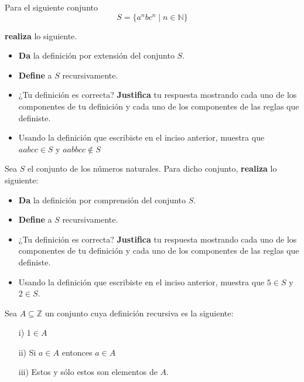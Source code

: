 \documentclass[oneside]{style}
\begin{document}
\begin{questions}[label=\protect\circled{\bfseries\arabic*}]
    \question
    {
        Para el siguiente conjunto 
        \begin{equation*}
            S = \{a^n b c^n \; | \; n \in \mathbb{N}\}
        \end{equation*}

        \textbf{realiza} lo siguiente.
        \begin{itemize}
            \item \textbf{Da} la definición por extensión del conjunto $S$.
            \item \textbf{Define} a $S$ recursivamente.
            \item ¿Tu definición es correcta? \textbf{Justifica} tu respuesta 
            mostrando cada uno de los componentes de tu definición y cada uno 
            de los componentes de las reglas que definiste. 
            \item Usando la definición que escribiste en el inciso anterior, 
            muestra que $aabcc \in S$ y $aabbcc \not \in S$
        \end{itemize}
    }

    \question
    {
        Sea $S$ el conjunto de los números naturales. Para dicho conjunto, 
        \textbf{realiza} lo siguiente:
        \begin{itemize}
            \item \textbf{Da} la definición por comprensión del conjunto $S$.
            \item \textbf{Define} a $S$ recursivamente.
            \item ¿Tu definición es correcta? \textbf{Justifica} tu respuesta 
            mostrando cada uno de los componentes de tu definición y cada uno 
            de los componentes de las reglas que definiste. 
            \item Usando la definición que escribiste en el inciso anterior, 
            muestra que $5 \in S$ y $2 \in S$. 
        \end{itemize}
    }



    \question
    {
        Sea $A \subseteq \mathbb{Z}$ un conjunto cuya definición recursiva es 
        la siguiente:
        \begin{itemize}
            \item[i)] $1 \in A$
            \item[ii)] Si $a \in A$ entonces $a \in A$
            \item[iii)] Estos y sólo estos son elementos de $A$.
        \end{itemize}   

}
\end{questions}
\end{document}
